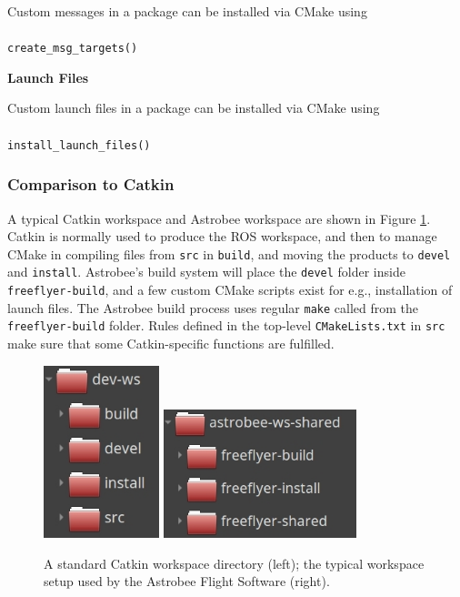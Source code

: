 \documentclass{article}
\begin{document}
Custom messages in a package can be installed via CMake using\\\\
\texttt{create\_msg\_targets()}


\vspace{0.5cm}
\noindent\textbf{Launch Files}

Custom launch files in a package can be installed via CMake using\\\\
\texttt{install\_launch\_files()}


\subsubsection{Comparison to Catkin}

A typical Catkin workspace and Astrobee workspace are shown in Figure \ref{fig:ws}. Catkin is normally used to produce the ROS workspace, and then to manage CMake in compiling files from \texttt{src} in \texttt{build}, and moving the products to \texttt{devel} and \texttt{install}. Astrobee's build system will place the \texttt{devel} folder inside \texttt{freeflyer-build}, and a few custom CMake scripts exist for e.g., installation of launch files. The Astrobee build process uses regular \texttt{make} called from the \texttt{freeflyer-build} folder. Rules defined in the top-level \texttt{CMakeLists.txt} in \texttt{src} make sure that some Catkin-specific functions are fulfilled.

\begin{figure}[h!]
	\centering
	\includegraphics[width=0.3\textwidth, align=c]{img/catkin.jpg}
	\includegraphics[width=0.5\textwidth, align=c]{img/astrobee_ws.jpg}
	\caption{A standard Catkin workspace directory (left); the typical workspace setup used by the Astrobee Flight Software (right).}
	\label{fig:ws}
\end{figure}
\end{document}
